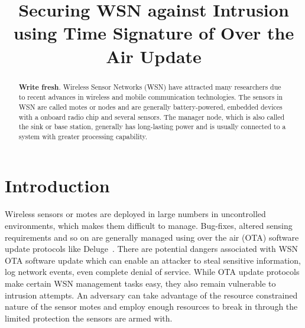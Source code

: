 \documentclass[conference]{IEEEtran}
\begin{document}
\title{Securing WSN against Intrusion using Time Signature of Over the Air Update}

\author{
		}


\maketitle

\begin{abstract}
\textbf{Write fresh}. Wireless Sensor Networks (WSN) have attracted many researchers due to recent advances in wireless and mobile communication technologies.
The sensors in WSN are called motes or nodes and are generally battery-powered, embedded devices with a onboard radio chip and several sensors.
The manager node, which is also called the sink or base station, generally has long-lasting power and is usually connected to a system with greater processing capability.
\end{abstract}

\section{Introduction}
\label{sec:intro}

Wireless sensors or motes are deployed in large numbers in uncontrolled environments, which makes them difficult to manage.
Bug-fixes, altered sensing requirements and so on are generally managed using over the air (OTA) software update protocols like Deluge~\cite{1031506}.
There are potential dangers associated with WSN OTA software update which can enable an attacker to steal sensitive information, log network events, even complete denial of service.
While OTA update protocols make certain WSN management tasks easy, they also remain vulnerable to intrusion attempts.
An adversary can take advantage of the resource constrained nature of the sensor motes and employ enough resources to break in through the limited protection the sensors are armed with.
\end{document}
